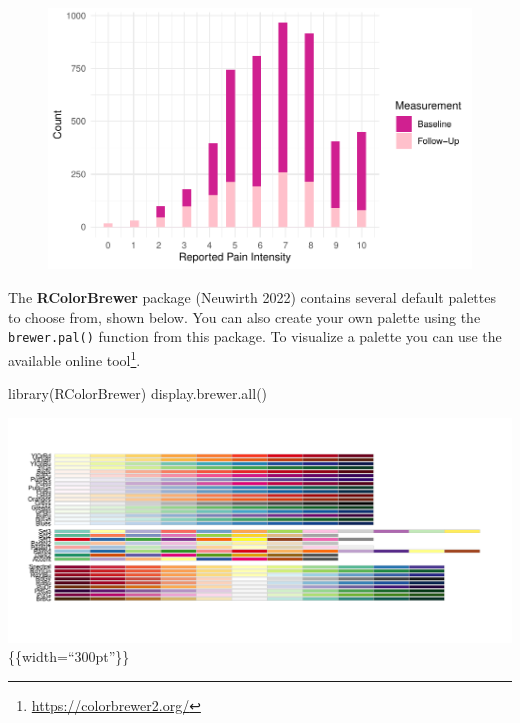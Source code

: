 \documentclass[
  letterpaper,
]{krantz}
\makeatletter
\newenvironment{Shaded}{\begin{snugshade}}{\end{snugshade}}
\newcommand{\FunctionTok}[1]{\textcolor[rgb]{0.28,0.35,0.67}{#1}}
\newcommand{\NormalTok}[1]{\textcolor[rgb]{0.00,0.23,0.31}{#1}}
\renewcommand{\href}[2]{#2\footnote{\url{#1}}}
\newenvironment{kframe}{%
\medskip{}
\setlength{\fboxsep}{.8em}
 \def\at@end@of@kframe{}%
 \ifinner\ifhmode%
  \def\at@end@of@kframe{\end{minipage}}%
  \begin{minipage}{\columnwidth}%
 \fi\fi%
 \def\FrameCommand##1{\hskip\@totalleftmargin \hskip-\fboxsep
 \colorbox{shadecolor}{##1}\hskip-\fboxsep
     \hskip-\linewidth \hskip-\@totalleftmargin \hskip\columnwidth}%
 \MakeFramed {\advance\hsize-\width
   \@totalleftmargin\z@ \linewidth\hsize
   \@setminipage}}%
 {\par\unskip\endMakeFramed%
 \at@end@of@kframe}
\renewenvironment{Shaded}{\begin{kframe}}{\end{kframe}}
\makeatother
\begin{document}
\begin{figure}[H]

{\centering \includegraphics[width=1\textwidth,height=\textheight]{book/7_visualization_ggplot_files/figure-pdf/unnamed-chunk-13-1.pdf}

}

\end{figure}

The \textbf{RColorBrewer} package (Neuwirth 2022) contains several
default palettes to choose from, shown below. You can also create your
own palette using the \texttt{brewer.pal()} function from this package.
To visualize a palette you can use the available
\href{https://colorbrewer2.org/}{online tool}.

\begin{Shaded}
\begin{Highlighting}[]
\FunctionTok{library}\NormalTok{(RColorBrewer)}
\FunctionTok{display.brewer.all}\NormalTok{()}
\end{Highlighting}
\end{Shaded}

\includegraphics{book/images/7-palettes.png}\{\{width=``300pt''\}\}
\end{document}
